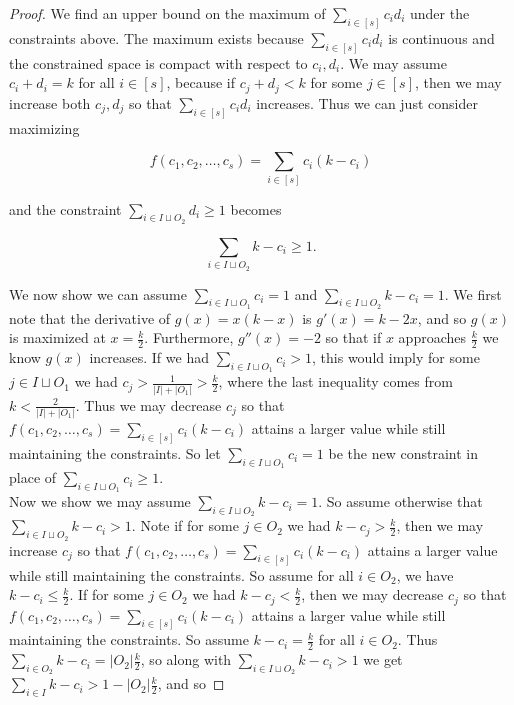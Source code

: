 \documentclass{article}
\begin{document}
\begin{proof}
We find an upper bound on the maximum of $\sum_{i \in [s]} c_id_i$ under the constraints above. The maximum exists because $\sum_{i \in [s]} c_id_i$ is continuous and the constrained space is compact with respect to $c_i,d_i$. We may assume $c_i + d_i = k$ for all $i \in [s]$, because if $c_j + d_j < k$ for some $j \in [s]$, then we may increase both $c_j,d_j$ so that $\sum_{i \in [s]} c_id_i$ increases. Thus we can just consider maximizing  

$$f(c_1,c_2,\ldots,c_{s}) = \sum_{i \in [s]} c_i(k-c_i)$$

\noindent
and the constraint $\sum_{i \in I \sqcup O_2} d_i \geq 1$ becomes

$$\sum_{i \in I \sqcup O_2} k-c_i  \geq 1.$$

We now show we can assume $\sum_{i \in I \sqcup O_1} c_i  = 1$ and $\sum_{i \in I \sqcup O_2} k-c_i  = 1$. We first note that the derivative of $g(x) = x(k-x)$ is $g'(x) = k-2x$, and so $g(x)$ is maximized at $x = \frac{k}{2}$. Furthermore, $g''(x) = -2$ so that if $x$ approaches $\frac{k}{2}$ we know $g(x)$ increases. If we had $\sum_{i \in I \sqcup O_1} c_i  > 1$, this would imply for some $j \in I \sqcup O_1$ we had $c_j > \frac{1}{|I| + |O_1|} > \frac{k}{2}$, where the last inequality comes from $k < \frac{2}{|I|+|O_1|}$. Thus we may decrease $c_j$ so that $f(c_1,c_2,\ldots,c_{s}) = \sum_{i \in [s]} c_i(k-c_i)$ attains a larger value while still maintaining the constraints. So let $\sum_{i \in I \sqcup O_1} c_i  = 1$ be the new constraint in place of $\sum_{i \in I \sqcup O_1} c_i  \geq 1$. \\

Now we show we may assume $\sum_{i \in I \sqcup O_2} k-c_i = 1$. So assume otherwise that $\sum_{i \in I \sqcup O_2} k-c_i > 1$. Note if for some $j \in O_2$ we had $k -  c_j > \frac{k}{2}$, then we may increase $c_j$ so that $f(c_1,c_2,\ldots,c_{s}) = \sum_{i \in [s]} c_i(k-c_i)$ attains a larger value while still maintaining the constraints. So assume for all $i \in O_2$, we have $k-c_i \leq \frac{k}{2}$. If for some $j \in O_2$ we had $k-c_j < \frac{k}{2}$, then we may decrease $c_j$ so that $f(c_1,c_2,\ldots,c_{s}) = \sum_{i \in [s]} c_i(k-c_i)$ attains a larger value while still maintaining the constraints. So assume $k-c_i = \frac{k}{2}$ for all $i \in O_2$. Thus $\sum_{i \in O_2} k-c_i = |O_2|\frac{k}{2}$, so along with $\sum_{i \in I \sqcup O_2} k-c_i > 1$ we get $\sum_{i \in I} k-c_i > 1 - | O_2|\frac{k}{2}$, and so 


\end{proof}
\end{document}
